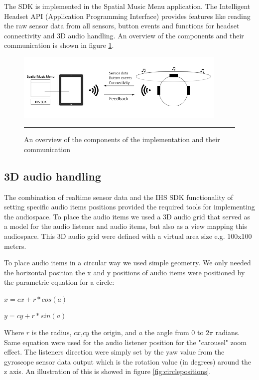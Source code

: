 The SDK is implemented in the Spatial Music Menu application. The Intelligent Headset API (Application Programming Interface) provides features like reading the raw sensor data from all sensors, button events and functions for headset connectivity and 3D audio handling. An overview of the components and their communication is shown in figure \ref{fig:implementationoverview}.

\begin{figure}[t]
	\centering
		\includegraphics[width=0.9\textwidth,height=\textheight,keepaspectratio]{./Figures/implementation_overview.png}
		\rule{35em}{1pt}
	\caption[Implementation overview]{An overview of the components of the implementation and their communication}
	\label{fig:implementationoverview}
\end{figure}

\subsection{3D audio handling}
The combination of realtime sensor data and the IHS SDK functionality of setting specific audio items positions provided the required tools for implementing the audiospace. To place the audio items we used a 3D audio grid that served as a model for the audio listener and audio items, but also as a view mapping this audiospace. This 3D audio grid were defined with a virtual area size e.g. 100x100 meters.

To place audio items in a circular way we used simple geometry. We only needed the horizontal position the x and y positions of audio items were positioned by the parametric equation for a circle:

$x = cx + r * cos(a)$

$y = cy + r * sin(a)$

Where $r$ is the radius, $cx$,$cy$ the origin, and $a$ the angle from $0$ to $2\pi$ radians. Same equation were used for the audio listener position for the "carousel" zoom effect. The listeners direction were simply set by the yaw value from the gyroscope sensor data output which is the rotation value (in degrees) around the z axis. An illustration of this is showed in figure \ref{fig:circlepositions}.

